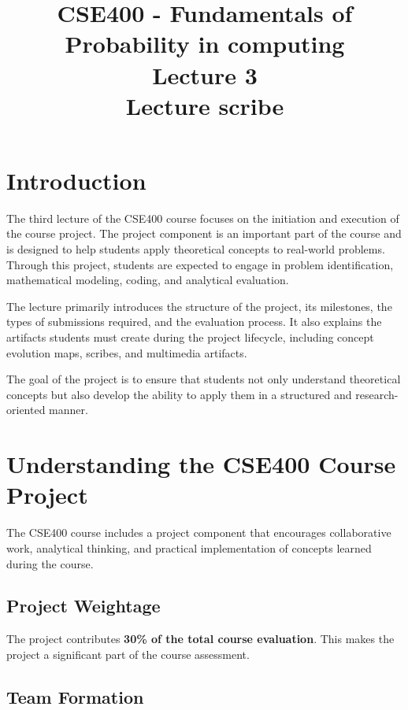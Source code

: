 \documentclass[12pt,a4paper]{article}
\title{\textbf{CSE400 - Fundamentals of Probability in computing}\\Lecture 3 \\Lecture scribe }
\author{}
\date{}
\begin{document}
\maketitle
\thispagestyle{empty}

\tableofcontents
\newpage

\section{Introduction}

The third lecture of the CSE400 course focuses on the initiation and execution of the course project. The project component is an important part of the course and is designed to help students apply theoretical concepts to real-world problems. Through this project, students are expected to engage in problem identification, mathematical modeling, coding, and analytical evaluation.

The lecture primarily introduces the structure of the project, its milestones, the types of submissions required, and the evaluation process. It also explains the artifacts students must create during the project lifecycle, including concept evolution maps, scribes, and multimedia artifacts.

The goal of the project is to ensure that students not only understand theoretical concepts but also develop the ability to apply them in a structured and research-oriented manner.

\section{Understanding the CSE400 Course Project}

The CSE400 course includes a project component that encourages collaborative work, analytical thinking, and practical implementation of concepts learned during the course.

\subsection{Project Weightage}

The project contributes \textbf{30\% of the total course evaluation}. This makes the project a significant part of the course assessment.

\subsection{Team Formation}
\end{document}
